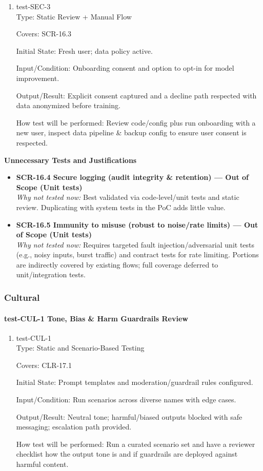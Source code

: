 \documentclass[12pt, titlepage]{article}
\begin{document}
\begin{enumerate}
\item{test-SEC-3\\}
Type: Static Review + Manual Flow

Covers: SCR-16.3

Initial State: Fresh user; data policy active.

Input/Condition: Onboarding consent and option to opt-in for model improvement.

Output/Result: Explicit consent captured and a decline path respected with data anonymized before training.

How test will be performed: Review code/config plus run onboarding with a new user, inspect data pipeline \& backup config to ensure user consent is respected.
\end{enumerate}

\noindent\textbf{Unnecessary Tests and Justifications}
\begin{itemize}
\item \textbf{SCR-16.4 Secure logging (audit integrity \& retention) — Out of Scope (Unit tests)}\\
\emph{Why not tested now:} Best validated via code-level/unit tests and static review. Duplicating with system tests in the PoC adds little value.
\item \textbf{SCR-16.5 Immunity to misuse (robust to noise/rate limits) — Out of Scope (Unit tests)}\\
\emph{Why not tested now:} Requires targeted fault injection/adversarial unit tests (e.g., noisy inputs, burst traffic) and contract tests for rate limiting. Portions are indirectly covered by existing flows; full coverage deferred to unit/integration tests.
\end{itemize}

\subsubsection{Cultural}

\paragraph{test-CUL-1 Tone, Bias \& Harm Guardrails Review}

\begin{enumerate}
\item{test-CUL-1\\}
Type: Static and Scenario-Based Testing

Covers: CLR-17.1

Initial State: Prompt templates and moderation/guardrail rules configured.

Input/Condition: Run scenarios across diverse names with edge cases.

Output/Result: Neutral tone; harmful/biased outputs blocked with safe messaging; escalation path provided.

How test will be performed: Run a curated scenario set and have a reviewer checklist how the output tone is and if guardrails are deployed against harmful content.
\end{enumerate}
\end{document}
